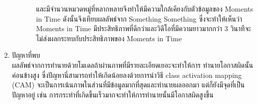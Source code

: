 \begin{enumerate}
\begin{enumerate}
\begin{enumerate}
				และมีจำนวนหมวดหมู่ที่หลากหลายจึงทำให้มีความใกล้เคียงกับตัวข้อมูลของ Moments in Time ดังนั้นจึงเทียบผลลัพธ์จาก Something Something 
				ซึ่งจะทำให้เห็นว่า Moments in Time มีประสิทธิภาพที่ดีกว่าและวิดีโอที่มีความยาวมากกว่า 3 วินาทีจะไม่ส่งผลกระทบกับประสิทธิภาพของ Moments in Time
		\end{enumerate}
	\end{enumerate}
	\item {ปัญหาที่พบ}\\
	ผลลัพธ์จากการทำนายด้วยโมเดลถ้าผ่านภาพที่มีรายละเอียดเยอะจะทำให้การ ทำนายโอกาสผิดนั้นค่อนข้างสูง ซึ่งปัญหานี่สามารถทำให้เกิดน้อยลงด้วยการนำวิธี 
	class activation mapping (CAM) จะเป็นการเน้นภาพในส่วนที่มีข้อมูลมากที่สุดและทำนายผลออกมา แต่ก็ยังมีจุดที่เป็นปัญหาอยู่ เช่น 
	การกระทำที่เกิดขึ้นเร็วมากจะทำให้การทำนายนั้นมีโอกาสผิดสูงขึ้น
\end{enumerate}		